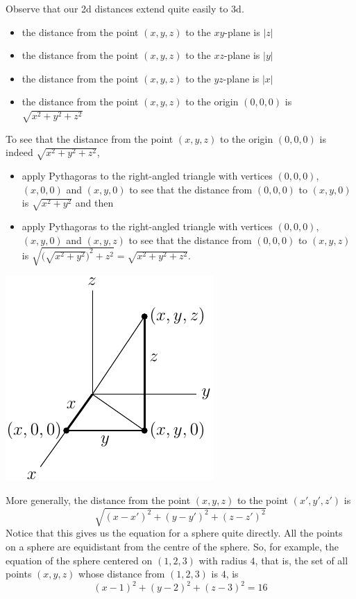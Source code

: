 Observe that our 2d distances extend quite easily to 3d.
\begin{itemize}\itemsep1pt \parskip0pt 
\item the distance from the point $(x,y,z)$ to the $xy$-plane is $|z|$
\item the distance from the point $(x,y,z)$ to the $xz$-plane is $|y|$
\item the distance from the point $(x,y,z)$ to the $yz$-plane is $|x|$
\item the distance from the point $(x,y,z)$ to the origin $(0,0,0)$ is 
     $\sqrt{x^2+y^2+z^2}$
\end{itemize}
To see that the distance from the point $(x,y,z)$ to the origin $(0,0,0)$ 
is indeed  $\sqrt{x^2+y^2+z^2}$,
\begin{itemize}\itemsep1pt \parskip0pt 
\item 
apply Pythagoras to the right-angled triangle with vertices $(0,0,0)$,
$(x,0,0)$ and $(x,y,0)$ to see that the distance from $(0,0,0)$
to $(x,y,0)$ is $\sqrt{x^2+y^2}$ and then
\item 
apply Pythagoras to the right-angled triangle with vertices $(0,0,0)$,
$(x,y,0)$ and $(x,y,z)$ to see that the distance from $(0,0,0)$
to $(x,y,z)$ is $\sqrt{{\big(\sqrt{x^2+y^2}\big)}^2+z^2}
=\sqrt{x^2+y^2+z^2}$.
\end{itemize}
\begin{efig}
\begin{center}
   \includegraphics{pythag3d.pdf}
\end{center}
\end{efig}
More generally, the distance from the point $(x,y,z)$ to the point 
$(x',y',z')$ is
\begin{equation*}
\sqrt{(x-x')^2+(y-y')^2+(z-z')^2}
\end{equation*}
Notice that this gives us the equation for a sphere quite directly. 
All the points on a sphere are equidistant from the centre of the sphere.
So, for example, the equation of the sphere centered on $(1,2,3)$ with 
radius $4$, that is, the set of all points $(x,y,z)$ whose distance 
from $(1,2,3)$ is $4$, is 
\begin{equation*}
(x-1)^2+(y-2)^2+(z-3)^2=16
\end{equation*}


